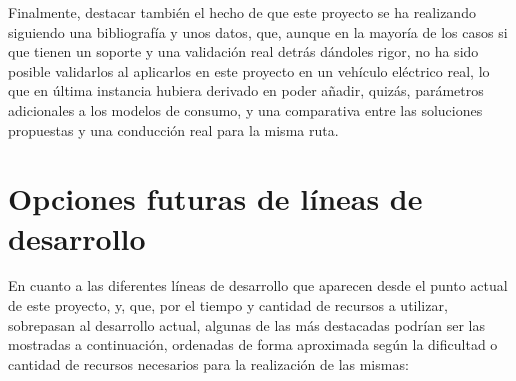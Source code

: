 \documentclass[11pt,spanish,listoffigures,listoftables]{tfgetsinf}
\begin{document}
Finalmente, destacar también el hecho de que este proyecto se ha realizando siguiendo una bibliografía y unos datos, que, aunque en la mayoría de los casos si que tienen un soporte y una validación real detrás dándoles rigor, no ha sido posible validarlos al aplicarlos en este proyecto en un vehículo eléctrico real, lo que en última instancia hubiera derivado en poder añadir, quizás, parámetros adicionales a los modelos de consumo, y una comparativa entre las soluciones propuestas y una conducción real para la misma ruta.

\section{Opciones futuras de líneas de desarrollo}
En cuanto a las diferentes líneas de desarrollo que aparecen desde el punto actual de este proyecto, y, que, por el tiempo y cantidad de recursos a utilizar, sobrepasan al desarrollo actual, algunas de las más destacadas podrían ser las mostradas a continuación, ordenadas de forma aproximada según la dificultad o cantidad de recursos necesarios para la realización de las mismas:
\end{document}
